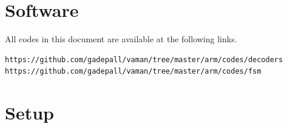 \documentclass[journal,12pt,twocolumn]{IEEEtran}
\begin{document}
\section{Software}
All codes in this document are available at the following links. 
\begin{lstlisting}
https://github.com/gadepall/vaman/tree/master/arm/codes/decoders
https://github.com/gadepall/vaman/tree/master/arm/codes/fsm
\end{lstlisting}
%
\section{Setup}
\renewcommand{\theequation}{\theenumi}
\renewcommand{\thefigure}{\theenumi}
\end{document}
